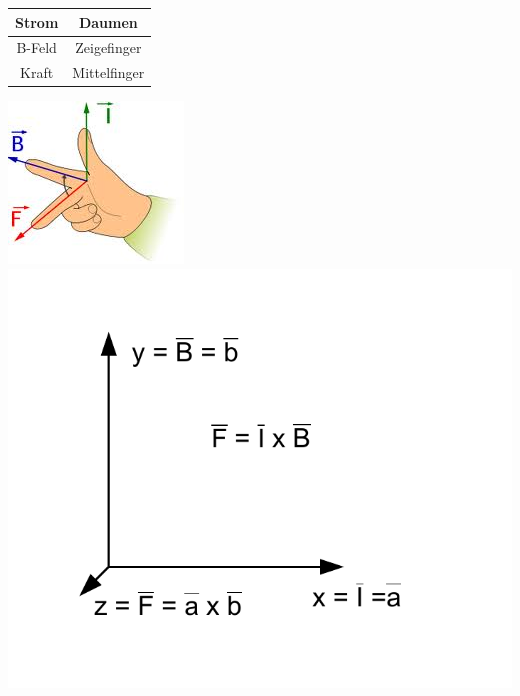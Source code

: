 		\begin{tabular}{|c|c|}
				\hline Strom & Daumen \\ 
				\hline B-Feld & Zeigefinger \\ 
				\hline Kraft & Mittelfinger \\ 				
				\hline
			\end{tabular} 
			\includegraphics[scale=0.5]{images/handregel.jpg}	
			\includegraphics[scale=0.5]{images/kreuzprodukt.pdf}
